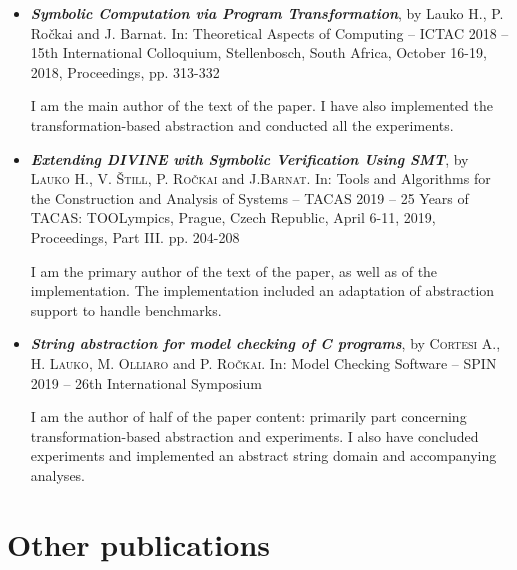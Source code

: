 \begin{itemize}

\item \textbf{\emph{Symbolic Computation via Program Transformation}}, by Lauko
H., P. Ročkai and J. Barnat.  In: Theoretical Aspects of Computing -- ICTAC 2018 --
15th International Colloquium, Stellenbosch, South Africa, October 16-19, 2018,
Proceedings, pp. 313-332~\cite{Lauko2018SymComp}

I am the main author of the text of the paper. I have also implemented the
transformation-based abstraction and conducted all the experiments.

\item \emph{\textbf{Extending \textsf{DIVINE} with Symbolic Verification Using SMT}},
by \textsc{Lauko} H., V. \textsc{Štill}, P. \textsc{Ročkai} and J.\textsc{Barnat}.
In: Tools and Algorithms for the Construction and Analysis of Systems -- TACAS 2019 --
25 Years of TACAS: TOOLympics, Prague, Czech Republic, April 6-11, 2019,
Proceedings, Part III. pp. 204-208~\cite{Lauko2019Sym}

I am the primary author of the text of the paper, as well as of the
implementation. The implementation included an adaptation of \divine
abstraction support to handle \svcomp benchmarks.

\item \textbf{\emph{String abstraction for model checking of C programs}},
by \textsc{Cortesi} A., H. \textsc{Lauko}, M. \textsc{Olliaro} and P. \textsc{Ročkai}.
        In: Model Checking Software -- SPIN 2019 -- 26th International Symposium~\cite{Lauko2019String}

I am the author of half of the paper content: primarily part concerning
transformation-based abstraction and experiments. I also have concluded
experiments and implemented an abstract string domain and accompanying
\lart analyses.

\end{itemize}

\section{Other publications}


